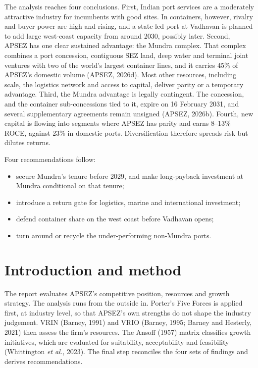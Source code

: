 \documentclass[12pt, a4paper]{article}
\begin{document}
The analysis reaches four conclusions. First, Indian port services are a
moderately attractive industry for incumbents with good sites. In containers,
however, rivalry and buyer power are high and rising, and a state-led port at
Vadhavan is planned to add large west-coast capacity from around 2030, possibly
later. Second, APSEZ has one clear sustained advantage: the Mundra complex. That
complex combines a port concession, contiguous SEZ land, deep water and terminal
joint ventures with two of the world's largest container lines, and it carries
45\% of APSEZ's domestic volume (APSEZ, 2026d). Most other resources, including
scale, the logistics network and access to capital, deliver parity or a
temporary advantage. Third, the Mundra advantage is legally contingent. The
concession, and the container sub-concessions tied to it, expire on 16 February
2031, and several supplementary agreements remain unsigned (APSEZ, 2026b).
Fourth, new capital is flowing into segments where APSEZ has parity and earns
8--13\% ROCE, against 23\% in domestic ports. Diversification therefore spreads
risk but dilutes returns.

Four recommendations follow:
\begin{itemize}
  \item secure Mundra's tenure before 2029, and make long-payback investment at
        Mundra conditional on that tenure;
  \item introduce a return gate for logistics, marine and international investment;
  \item defend container share on the west coast before Vadhavan opens;
  \item turn around or recycle the under-performing non-Mundra ports.
\end{itemize}

\section{Introduction and method}\label{sec:method}
The report evaluates APSEZ's competitive position, resources and growth
strategy. The analysis runs from the outside in. Porter's Five Forces is
applied first, at industry level, so that APSEZ's own strengths do not shape
the industry judgement. VRIN (Barney, 1991) and VRIO (Barney, 1995; Barney and
Hesterly, 2021) then assess the firm's resources. The Ansoff (1957) matrix
classifies growth initiatives, which are evaluated for suitability,
acceptability and feasibility (Whittington \textit{et al.}, 2023). The final
step reconciles the four sets of findings and derives recommendations.
\end{document}
